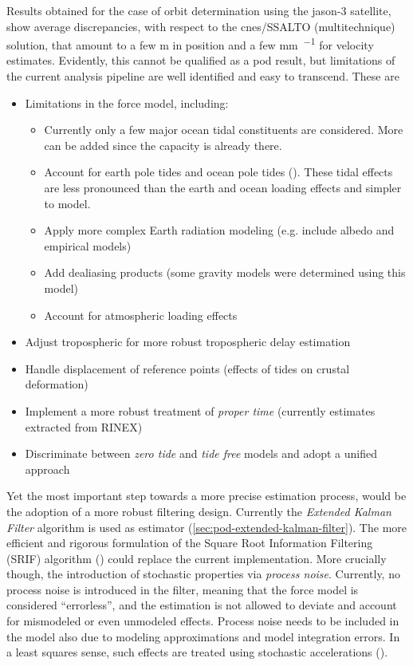 Results obtained for the case of orbit determination using the \gls{jason}-3 satellite, 
show average discrepancies, with respect to the \gls{cnes}/SSALTO (multitechnique) solution, 
that amount to a few \si{\meter} in position and a few \si{\milli\meter\per\sec} for 
velocity estimates. Evidently, this cannot be qualified as a \gls{pod} result, but limitations 
of the current analysis pipeline are well identified and easy to transcend. These are
\begin{itemize}
  \item Limitations in the force model, including:
    \begin{itemize}
      \item Currently only a few major ocean tidal constituents are considered. More 
        can be added since the capacity is already there.
      \item Account for earth pole tides and ocean pole tides (\cite{iers2010}). These 
        tidal effects are less pronounced than the earth and ocean loading effects and 
        simpler to model.
      \item Apply more complex Earth radiation modeling (e.g. include albedo and empirical models)
      \item Add dealiasing products (some gravity models were determined using this model)
      \item Account for atmospheric loading effects
    \end{itemize}
  \item Adjust tropospheric for more robust tropospheric delay estimation
  \item Handle displacement of reference points (effects of tides on crustal deformation)
  \item Implement a more robust treatment of \emph{proper time} (currently estimates extracted from RINEX)
  \item Discriminate between \emph{zero tide} and \emph{tide free} models and adopt a unified approach
\end{itemize}

Yet the most important step towards a more precise estimation process, would be the adoption 
of a more robust filtering design. Currently the \emph{Extended Kalman Filter} algorithm is used 
as estimator (\autoref{sec:pod-extended-kalman-filter}). The more efficient and 
rigorous formulation of the Square Root Information Filtering (SRIF) algorithm (\cite{Tapley2004}) could 
replace the current implementation. More crucially though, the introduction of stochastic 
properties via \emph{process noise}. Currently, no process noise is introduced in the filter, 
meaning that the force model is considered ``errorless'', and the estimation is not 
allowed to deviate and account for mismodeled or even unmodeled effects. Process noise 
needs to be included in the model also due to modeling approximations and model integration errors.
In a least squares sense, such effects are treated using stochastic accelerations (\cite{Jaggi2005b}).

